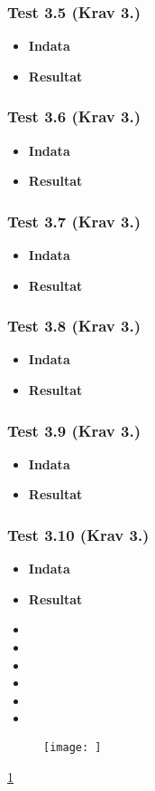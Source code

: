\documentclass{TDP003mall}
\begin{document}
\subsubsection*{Test 3.5 (Krav 3.)}
\begin{itemize}
\item[]\textbf{Indata} 
\item[]\textbf{Resultat} 
\end{itemize}
\subsubsection*{Test 3.6 (Krav 3.)}
\begin{itemize}
\item[]\textbf{Indata} 
\item[]\textbf{Resultat} 
\end{itemize}
\subsubsection*{Test 3.7 (Krav 3.)}
\begin{itemize}
\item[]\textbf{Indata} 
\item[]\textbf{Resultat} 
\end{itemize}
\subsubsection*{Test 3.8 (Krav 3.)}
\begin{itemize}
\item[]\textbf{Indata} 
\item[]\textbf{Resultat} 
\end{itemize}
\subsubsection*{Test 3.9 (Krav 3.)}
\begin{itemize}
\item[]\textbf{Indata} 
\item[]\textbf{Resultat} 
\end{itemize}
\subsubsection*{Test 3.10 (Krav 3.)}
\begin{itemize}
\item[]\textbf{Indata} 
\item[]\textbf{Resultat} 
\end{itemize}



\begin{itemize}
    \item 
    \item 
    \item 
    \item 
    \item 
    \item 
\end{itemize}


\begin{figure}[h]
  \centerline{\texttt{[image: ]}}
  \caption{ \label{fig:2}}
\end{figure}

\ref{fig:2} 
\end{document}
